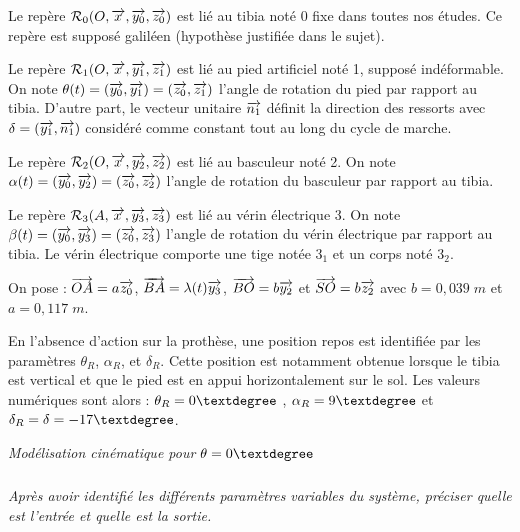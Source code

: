 \documentclass[10pt]{article}
\begin{document}
\begin{minipage}[c]{.54\linewidth}

Le repère $\mathcal{R}_{0} (O, \overrightarrow{x_{}},\overrightarrow{y_{0}} ,\overrightarrow{z_{0}})$ est lié au tibia noté 0 fixe dans toutes nos études. Ce repère est supposé galiléen (hypothèse justifiée dans le sujet).

Le repère $\mathcal{R}_{1} (O, \overrightarrow{x_{}},\overrightarrow{y_{1}} ,\overrightarrow{z_{1}} )$ est lié au pied artificiel noté 1, supposé indéformable. On note $\theta (t)=(\overrightarrow{y_{0}} ,\overrightarrow{y_{1}})=(\overrightarrow{z_{0}},\overrightarrow{z_{1}})$ l'angle de rotation du pied par rapport au tibia. D'autre part, le vecteur unitaire $\overrightarrow{n_1}$ définit la direction des ressorts avec $\delta=(\overrightarrow{y_{1}} ,\overrightarrow{n_1})$ considéré comme constant tout au long
du cycle de marche.

Le repère $\mathcal{R}_{2} (O, \overrightarrow{x_{}} ,\overrightarrow{y_{2}} ,\overrightarrow{z_{2}} )$ est lié au basculeur noté 2. On note $\alpha(t) =(\overrightarrow{y_{0}} ,\overrightarrow{y_{2}})=(\overrightarrow{z_{0}} ,\overrightarrow{z_{2}})$ l'angle de rotation du basculeur par rapport au tibia.

Le repère $\mathcal{R}_{3} ( A, \overrightarrow{x_{}},\overrightarrow{y_{3}} ,\overrightarrow{z_{3}})$ est lié au vérin électrique 3. On note $\beta(t )=(\overrightarrow{y_{0}} ,\overrightarrow{y_{3}})=(\overrightarrow{z_{0}} ,\overrightarrow{z_{3}})$ l'angle de rotation du vérin électrique par rapport au tibia. Le vérin électrique comporte une tige notée $3_1$ et un
corps noté $3_2$.

On pose : $\overrightarrow{OA}=a\overrightarrow{z_0}$, $\overrightarrow{BA}=\lambda(t)\overrightarrow{y_{3}}$, $\overrightarrow{BO}=b\overrightarrow{y_{2}}$ et 
$\overrightarrow{SO}=b\overrightarrow{z_{2}}$ avec $b=0,039 \; m$ et $a=0,117\;m$.

En l'absence d'action sur la prothèse, une position repos est identifiée par les paramètres $\theta_R$, $\alpha_R$, et $\delta_R$. Cette position est notamment obtenue lorsque le tibia est vertical et que le pied est en appui horizontalement
sur le sol. Les valeurs numériques sont alors : $\theta_R=0\textdegree$ , $\alpha_R=9\textdegree$ et $\delta_R=\delta=-17\textdegree$.
\end{minipage} \hfill
\begin{minipage}[c]{.43\linewidth}
\begin{center}

\textit{Modélisation cinématique pour $\theta=0\textdegree$}
\end{center}
\end{minipage}

\fi



\subparagraph{}
\textit{Après avoir identifié les différents paramètres variables du système, préciser quelle est l'entrée et quelle est la sortie.}%
\end{document}
